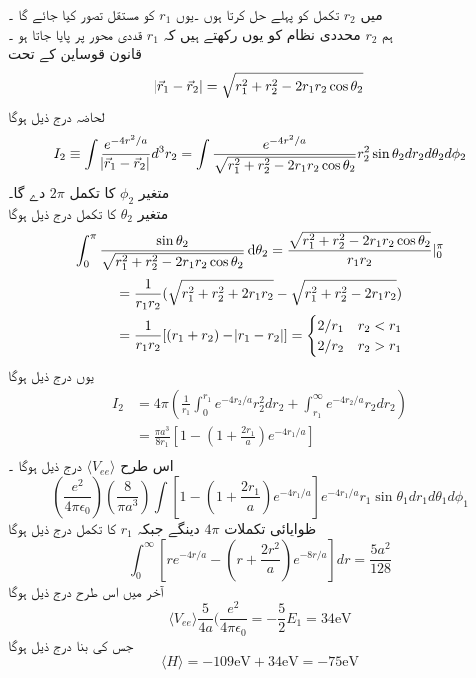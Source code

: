 \documentclass{book}
\begin{document}
میں 
\(r_{2}\)
 تکمل کو پہلے حل کرتا ہوں ۔یوں
  \(r_{1}\)
کو مستقل تصور کیا جائے گا ۔\\
ہم 
\(r_{2}\)
 محددی نظام کو یوں رکھتے ہیں کہ
 \(r_{1}\)
  قددی محور پر پایا جاتا ہو ۔\\
قانون قوساین کے تحت 
\[\abs{\vec{r}_{1}-\vec{r}_{2}}=\sqrt{r_{1}^{2}+r_{2}^{2}-2r_{1}r_{2}\cos{\theta_{2}}}\]
لحاضہ درج ذیل ہوگا \\
\[I_{2}\equiv\int\frac{e^{-4r^{2}/a}}{\abs{\vec{r}_{1}-\vec{r}_{2}}}d^{3}r_{2}=\int\frac{e^{-4r^{2}/a}}{\sqrt{r_{1}^{2}+r_{2}^{2}-2r_{1}r_{2}\cos{\theta_{2}}}}r_{2}^{2}\sin{\theta_{2}}dr_{2}d\theta_{2}d\phi_{2}\]
متغیر 
\(\phi_{2}\)
کا تکمل 
\(2\pi\)
 دے گا۔\\
متغیر 
\(\theta_{2}\)
 کا تکمل  درج ذیل ہوگا
\begin{align*}
\int_{0}^{\pi}\frac{\sin{\theta_{2}}}{\sqrt{r_{1}^{2}+r_{2}^{2}-2r_{1}r_{2}\cos{\theta_{2}}}}\dif{\theta_{2}}=\frac{\sqrt{r_{1}^{2}+r_{2}^{2}-2r_{1}r_{2}\cos{\theta_{2}}}}{r_{1}r_{2}}|_{0}^{\pi}
\end{align*}
\begin{align*}
&=\frac{1}{r_{1}r_{2}}(\sqrt{r_{1}^{2}+r_{2}^{2}+2r_{1}r_{2}}-\sqrt{r_{1}^{2}+r_{2}^{2}-2r_{1}r_{2}})\\
&=\frac{1}{r_{1}r_{2}}[(r_{1}+r_{2})-\abs{r_{1}-r_{2}}]=\begin{cases}
2/r_{1} & r_{2}<r_{1}\\
2/r_{2}&r_{2}>r_{1}\\
\end{cases}\\
\end{align*}
یوں درج ذیل ہوگا 
\begin{align*}
I_{2}&=4\pi(\frac{1}{r_{1}}\int_{0}^{r_{1}}e^{-4r_{2}/a}r_{2}^{2}dr_{2}+\int_{r_{1}}^{\infty}e^{-4r_{2}/a}r_{2}dr_{2})\\
&=\frac{\pi a^{3}}{8r_{1}}[1-(1+\frac{2r_{1}}{a})e^{-4r_{1}/a}]\\
\end{align*}
اس طرح 
\(\langle V_{ee} \rangle \)
درج ذیل ہوگا ۔
\[(\frac{e^{2}}{4\pi\epsilon_{0}})(\frac{8}{\pi a^{3}})\int[1-(1+\frac{2r_{1}}{a})e^{-4r_{1}/a}]e^{-4r_{1}/a}r_{1}\sin{\theta_{1}}dr_{1}d\theta_{1}d\phi_{1}\]
ظوایائی تکملات 
\(4\pi\)
دینگے جبکہ 
\(r_{1}\)
 کا تکمل درج ذیل ہوگا
\[\int_{0}^{\infty}[re^{-4r/a}-(r+\frac{2r^{2}}{a})e^{-8r/a}]dr=\frac{5a^{2}}{128}\]
آخر میں اس طرح درج ذیل ہوگا 
\[\langle V_{ee} \rangle\frac{5}{4a}(\frac{e^{2}}{4\pi\epsilon_{0}}=-\frac{5}{2}E_{1}=34\text{eV}\]
جس کی بنا درج ذیل ہوگا 
\[\langle H \rangle =-109 \text{eV}+34 \text{eV}=-75\text{eV}\]
\end{document}
